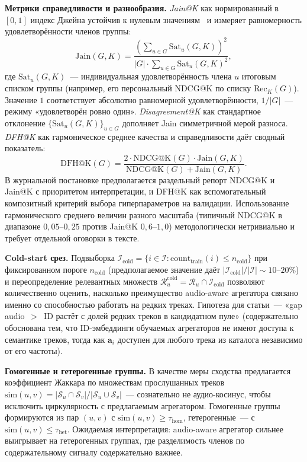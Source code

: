 \textbf{Метрики справедливости и разнообразия.} \emph{Jain@K} как нормированный в $[0, 1]$ индекс Джейна устойчив к нулевым значениям~\cite{jin2023fairness_survey} и измеряет равномерность удовлетворённости членов группы:
\begin{equation*}
    \mathrm{Jain}(G, K) = \frac{ \left( \sum_{u \in G} \mathrm{Sat}_u(G, K) \right)^2 }{ |G| \cdot \sum_{u \in G} \mathrm{Sat}_u(G, K)^2 },
\end{equation*}
где $\mathrm{Sat}_u(G, K)$~--- индивидуальная удовлетворённость члена $u$ итоговым списком группы (например, его персональный NDCG@K по списку $\mathrm{Rec}_K(G)$). Значение $1$ соответствует абсолютно равномерной удовлетворённости, $1/|G|$~--- режиму «удовлетворён ровно один». \emph{Disagreement@K} как стандартное отклонение $\{\mathrm{Sat}_u(G, K)\}_{u \in G}$ дополняет Jain симметричной мерой разноса. \emph{DFH@K} как гармоническое среднее качества и справедливости даёт сводный показатель:
\begin{equation*}
    \mathrm{DFH@K}(G) = \frac{2 \cdot \mathrm{NDCG@K}(G) \cdot \mathrm{Jain}(G, K)}{ \mathrm{NDCG@K}(G) + \mathrm{Jain}(G, K) }.
\end{equation*}
В журнальной постановке предполагается раздельный репорт NDCG@K и Jain@K с приоритетом интерпретации, и DFH@K как вспомогательный композитный критерий выбора гиперпараметров на валидации. Использование гармонического среднего величин разного масштаба (типичный NDCG@K в диапазоне $0{,}05$--$0{,}25$ против Jain@K $0{,}6$--$1{,}0$) методологически нетривиально и требует отдельной оговорки в тексте.

\textbf{Cold-start срез.} Подвыборка $\mathcal{I}_{\mathrm{cold}} = \{i \in \mathcal{I} : \mathrm{count}_{\mathrm{train}}(i) \leq n_{\mathrm{cold}}\}$ при фиксированном пороге $n_{\mathrm{cold}}$ (предполагаемое значение даёт $|\mathcal{I}_{\mathrm{cold}}| / |\mathcal{I}| \sim 10$--$20\%$) и переопределение релевантных множеств $\mathcal{R}_u^{\mathrm{cold}} = \mathcal{R}_u \cap \mathcal{I}_{\mathrm{cold}}$ позволяют количественно оценить, насколько преимущество audio-aware агрегатора связано именно со способностью работать на редких треках. Гипотеза для статьи~--- «gap audio~$>$~ID растёт с долей редких треков в кандидатном пуле» (содержательно обоснована тем, что ID-эмбеддинги обучаемых агрегаторов не имеют доступа к семантике треков, тогда как $\mathbf{a}_i$ доступен для любого трека из каталога независимо от его частоты).

\textbf{Гомогенные и гетерогенные группы.} В качестве меры сходства предлагается коэффициент Жаккара по множествам прослушанных треков $\mathrm{sim}(u, v) = |\mathcal{S}_u \cap \mathcal{S}_v| / |\mathcal{S}_u \cup \mathcal{S}_v|$~--- сознательно не аудио-косинус, чтобы исключить циркулярность с предлагаемым агрегатором. Гомогенные группы формируются из пар $(u, v)$ с $\mathrm{sim}(u, v) \geq \tau_{\mathrm{hom}}$, гетерогенные~--- с $\mathrm{sim}(u, v) \leq \tau_{\mathrm{het}}$. Ожидаемая интерпретация: audio-aware агрегатор сильнее выигрывает на гетерогенных группах, где разделимость членов по содержательному сигналу содержательно важнее.

